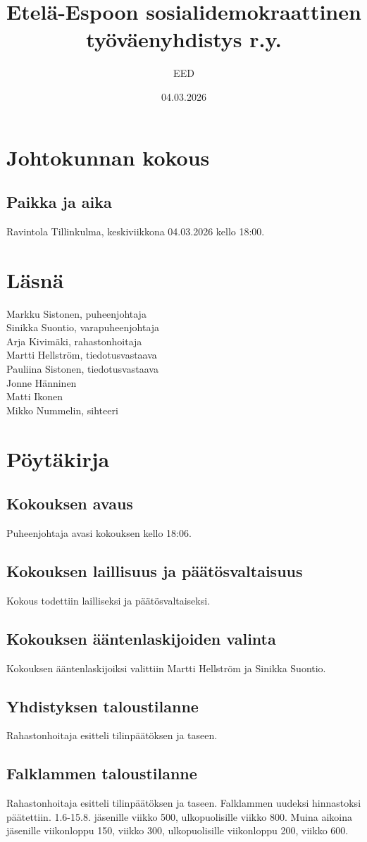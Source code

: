 \documentclass[a4paper,12pt]{article}
\title{Etelä-Espoon sosialidemokraattinen työväenyhdistys r.y.}
\author{EED}
\date{04.03.2026}
\begin{document}
\maketitle
\tableofcontents
\section*{Johtokunnan kokous}
\subsection*{Paikka ja aika}
Ravintola Tillinkulma, keskiviikkona 04.03.2026 kello 18:00.
\section*{Läsnä}
Markku Sistonen, puheenjohtaja \\
Sinikka Suontio, varapuheenjohtaja \\
Arja Kivimäki, rahastonhoitaja \\
Martti Hellström, tiedotusvastaava \\
Pauliina Sistonen, tiedotusvastaava \\
Jonne Hänninen \\
Matti Ikonen \\
Mikko Nummelin, sihteeri
\section*{Pöytäkirja}
\subsection{Kokouksen avaus}
Puheenjohtaja avasi kokouksen kello 18:06.
\subsection{Kokouksen laillisuus ja päätösvaltaisuus}
Kokous todettiin lailliseksi ja päätösvaltaiseksi.
\subsection{Kokouksen ääntenlaskijoiden valinta}
Kokouksen ääntenlaskijoiksi valittiin Martti Hellström ja Sinikka Suontio.
\subsection{Yhdistyksen taloustilanne}
Rahastonhoitaja esitteli tilinpäätöksen ja taseen.
\subsection{Falklammen taloustilanne}
Rahastonhoitaja esitteli tilinpäätöksen ja taseen. Falklammen uudeksi hinnastoksi päätettiin. 1.6-15.8. jäsenille viikko 500\EUR{}, ulkopuolisille viikko 800\EUR{}. Muina aikoina jäsenille viikonloppu 150\EUR{}, viikko 300\EUR{}, ulkopuolisille viikonloppu 200\EUR{}, viikko 600\EUR{}.
\end{document}
